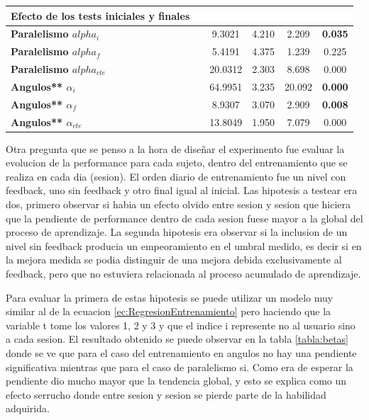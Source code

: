 \documentclass{article}
\begin{document}
\begin{table}
\begin{center}
\begin{tabular}{lccccc}
\midrule
\textbf{Efecto de los tests iniciales y finales} &&&&\\
\midrule
\textbf{Paralelismo $alpha_i$} & & 9.3021    &  4.210   &   2.209   &   \textbf{0.035}  \\%
\textbf{Paralelismo $alpha_f$} & & 5.4191    &   4.375  &    1.239  &    0.225 \\%
\textbf{Paralelismo $alpha_{cte}$} & & 20.0312  &    2.303  &    8.698  &    0.000  \\%
\midrule
\textbf{Angulos** $\alpha_i$} & & 64.9951   &   3.235  &   20.092  & \textbf{0.000} \\%
\textbf{Angulos** $\alpha_f$} & & 8.9307    &   3.070  &    2.909  &    \textbf{0.008}   \\%
\textbf{Angulos** $\alpha_{cte}$} & & 13.8049   &   1.950  &    7.079  &    0.000  \\%
\bottomrule
\end{tabular}

\end{center}

\end{table}

Otra pregunta que se penso a la hora de diseñar el experimento fue evaluar la evolucion de la performance para cada sujeto, dentro del entrenamiento que se realiza en cada dia (sesion). El orden diario de entrenamiento fue un nivel con feedback, uno sin feedback y otro final igual al inicial. Las hipotesis a testear era dos, primero observar si habia un efecto olvido entre sesion y sesion que hiciera que la pendiente de performance dentro de cada sesion fuese mayor a la global del proceso de aprendizaje. La segunda hipotesis era observar si la inclusion de un nivel sin feedback producia un empeoramiento en el umbral medido, es decir si en la mejora medida se podia distinguir de una mejora debida exclusivamente al feedback, pero que no estuviera relacionada al proceso acumulado de aprendizaje. 

Para evaluar la primera de estas hipotesis se puede utilizar un modelo muy similar al de la ecuacion \ref{ec:RegresionEntrenamiento} pero haciendo que la variable t tome los valores 1, 2 y 3 y que el indice i represente no al usuario sino a cada sesion. El resultado obtenido se puede observar en la tabla \ref{tabla:betas} donde se ve que para el caso del entrenamiento en angulos no hay una pendiente significativa mientras que para el caso de paralelismo si. Como era de esperar la pendiente dio mucho mayor que la tendencia global, y esto se explica como un efecto serrucho donde entre sesion y sesion se pierde parte de la habilidad adquirida. 
\end{document}
